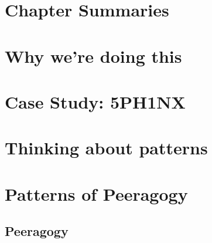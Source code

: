 \documentclass[nols,nobib]{tufte-book}
\begin{document}
\newpage




\chapter[\textbf{Chapter Summaries}]{Chapter Summaries}
%



%
\chapter[\textbf{Why we're doing this}]{Why we're doing this}

%
\chapter[\textbf{Case Study: 5PH1NX}]{Case Study: 5PH1NX}\label{sphinx-beginning}
%



%
\chapter[\textbf{Thinking about patterns}]{Thinking about patterns} \label{thinking-in-patterns}

%
\let\oldfootnote\footnote
\renewcommand*{\footnote}[1]{}%
\let\oldtextsuperscript\textsuperscript
\renewcommand*{\textsuperscript}[1]{}%
\chapter[\textbf{Patterns of Peeragogy}]{ Patterns of Peeragogy } \label{patterns}
 \label{sec:Introduction}
%
\section{Peeragogy} \label{sec:Peeragogy}

%
\end{document}
